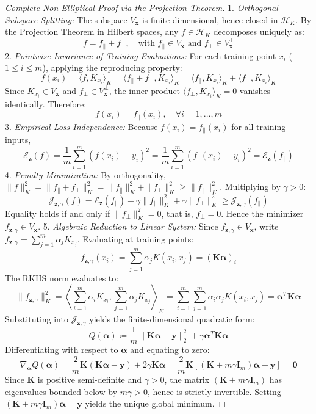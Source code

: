 \documentclass[11pt,a4paper]{article}
\theoremstyle{definition}
\begin{document}
\begin{proof}[Complete Non-Elliptical Proof via the Projection Theorem]
1. \emph{Orthogonal Subspace Splitting:} The subspace $V_{\mathbf{x}}$ is finite-dimensional, hence closed in $\mathcal{H}_K$. By the Projection Theorem in Hilbert spaces, any $f \in \mathcal{H}_K$ decomposes uniquely as:
\[
f = f_\parallel + f_\perp, \quad \text{with } f_\parallel \in V_{\mathbf{x}} \text{ and } f_\perp \in V_{\mathbf{x}}^\perp
\]
2. \emph{Pointwise Invariance of Training Evaluations:} For each training point $x_i$ ($1 \le i \le m$), applying the reproducing property:
\[
f(x_i) = \langle f, K_{x_i} \rangle_K = \langle f_\parallel + f_\perp, K_{x_i} \rangle_K = \langle f_\parallel, K_{x_i} \rangle_K + \langle f_\perp, K_{x_i} \rangle_K
\]
Since $K_{x_i} \in V_{\mathbf{x}}$ and $f_\perp \in V_{\mathbf{x}}^\perp$, the inner product $\langle f_\perp, K_{x_i} \rangle_K = 0$ vanishes identically. Therefore:
\[
f(x_i) = f_\parallel(x_i), \quad \forall i = 1, \dots, m
\]
3. \emph{Empirical Loss Independence:} Because $f(x_i) = f_\parallel(x_i)$ for all training inputs,
\[
\mathcal{E}_{\mathbf{z}}(f) = \frac{1}{m} \sum_{i=1}^m (f(x_i) - y_i)^2 = \frac{1}{m} \sum_{i=1}^m (f_\parallel(x_i) - y_i)^2 = \mathcal{E}_{\mathbf{z}}(f_\parallel)
\]
4. \emph{Penalty Minimization:} By orthogonality, $\|f\|_K^2 = \|f_\parallel + f_\perp\|_K^2 = \|f_\parallel\|_K^2 + \|f_\perp\|_K^2 \ge \|f_\parallel\|_K^2$.
Multiplying by $\gamma > 0$:
\[
\mathcal{J}_{\mathbf{z}, \gamma}(f) = \mathcal{E}_{\mathbf{z}}(f_\parallel) + \gamma \|f_\parallel\|_K^2 + \gamma \|f_\perp\|_K^2 \ge \mathcal{J}_{\mathbf{z}, \gamma}(f_\parallel)
\]
Equality holds if and only if $\|f_\perp\|_K^2 = 0$, that is, $f_\perp = 0$. Hence the minimizer $f_{\mathbf{z}, \gamma} \in V_{\mathbf{x}}$.
5. \emph{Algebraic Reduction to Linear System:} Since $f_{\mathbf{z}, \gamma} \in V_{\mathbf{x}}$, write $f_{\mathbf{z}, \gamma} = \sum_{j=1}^m \alpha_j K_{x_j}$.
Evaluating at training points:
\[
f_{\mathbf{z}, \gamma}(x_i) = \sum_{j=1}^m \alpha_j K(x_i, x_j) = (\mathbf{K} \boldsymbol{\alpha})_i
\]
The RKHS norm evaluates to:
\[
\|f_{\mathbf{z}, \gamma}\|_K^2 = \left\langle \sum_{i=1}^m \alpha_i K_{x_i}, \sum_{j=1}^m \alpha_j K_{x_j} \right\rangle_K = \sum_{i=1}^m \sum_{j=1}^m \alpha_i \alpha_j K(x_i, x_j) = \boldsymbol{\alpha}^T \mathbf{K} \boldsymbol{\alpha}
\]
Substituting into $\mathcal{J}_{\mathbf{z}, \gamma}$ yields the finite-dimensional quadratic form:
\[
Q(\boldsymbol{\alpha}) \coloneqq \frac{1}{m} \|\mathbf{K} \boldsymbol{\alpha} - \mathbf{y}\|_2^2 + \gamma \boldsymbol{\alpha}^T \mathbf{K} \boldsymbol{\alpha}
\]
Differentiating with respect to $\boldsymbol{\alpha}$ and equating to zero:
\[
\nabla_{\boldsymbol{\alpha}} Q(\boldsymbol{\alpha}) = \frac{2}{m} \mathbf{K} (\mathbf{K} \boldsymbol{\alpha} - \mathbf{y}) + 2 \gamma \mathbf{K} \boldsymbol{\alpha} = \frac{2}{m} \mathbf{K} \left[ (\mathbf{K} + m \gamma \mathbf{I}_m) \boldsymbol{\alpha} - \mathbf{y} \right] = \mathbf{0}
\]
Since $\mathbf{K}$ is positive semi-definite and $\gamma > 0$, the matrix $(\mathbf{K} + m \gamma \mathbf{I}_m)$ has eigenvalues bounded below by $m\gamma > 0$, hence is strictly invertible. Setting $(\mathbf{K} + m \gamma \mathbf{I}_m) \boldsymbol{\alpha} = \mathbf{y}$ yields the unique global minimum.
\end{proof}
\end{document}
